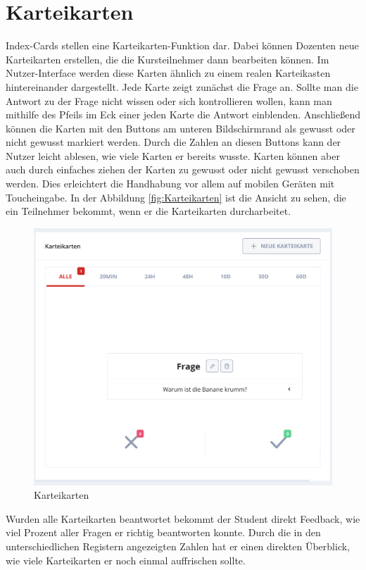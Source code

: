 \section{Karteikarten}\label{sec:Karteikarten}
Index-Cards stellen eine Karteikarten-Funktion dar. Dabei können Dozenten neue Karteikarten erstellen, die die Kursteilnehmer dann bearbeiten können.
Im Nutzer-Interface werden diese Karten ähnlich zu einem realen Karteikasten hintereinander dargestellt.
Jede Karte zeigt zunächst die Frage an.
Sollte man die Antwort zu der Frage nicht wissen oder sich kontrollieren wollen, kann man mithilfe des Pfeils im Eck einer jeden Karte die Antwort einblenden.
Anschließend können die Karten mit den Buttons am unteren Bildschirmrand als gewusst oder nicht gewusst markiert werden.
Durch die Zahlen an diesen Buttons kann der Nutzer leicht ablesen, wie viele Karten er bereits wusste.
Karten können aber auch durch einfaches ziehen der Karten zu gewusst oder nicht gewusst verschoben werden.
Dies erleichtert die Handhabung vor allem auf mobilen Geräten mit Toucheingabe. In der Abbildung \autoref{fig:Karteikarten} ist die Ansicht zu sehen, die ein Teilnehmer bekommt, wenn er die Karteikarten durcharbeitet.
\begin{figure}[h]
    \centering
    \includegraphics[width=.7\textwidth]{img/Karteikarten_hinzugefuegt.png}
    \caption{Karteikarten}
    \label{fig:Karteikarten}
\end{figure}

Wurden alle Karteikarten beantwortet bekommt der Student direkt Feedback, wie viel Prozent aller Fragen er richtig beantworten konnte. Durch die in den unterschiedlichen Registern angezeigten Zahlen hat er einen direkten Überblick, wie viele Karteikarten er noch einmal auffrischen sollte.


